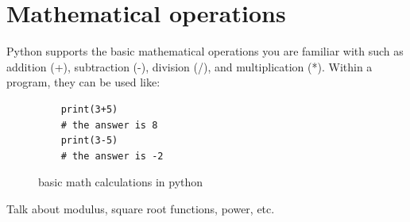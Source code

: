 \documentclass{book}
\begin{document}
\section{Mathematical operations}
Python supports the basic mathematical operations you are familiar with such as addition (+), subtraction (-), division (/), and multiplication (*). Within a program, they can be used like:

\begin{figure}[h]
	\caption{basic math calculations in python}
	\begin{lstlisting}
	print(3+5)
	# the answer is 8
	print(3-5)
	# the answer is -2
	\end{lstlisting}
\end{figure}

Talk about modulus, square root functions, power, etc.
\end{document}
